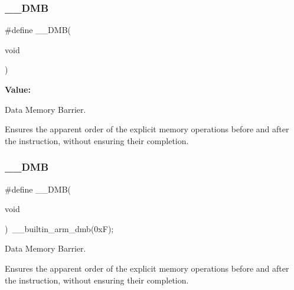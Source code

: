 \subsubsection{\texorpdfstring{\_\_DMB}{\_\_DMB}\hspace{0.1cm}{\footnotesize\ttfamily [1/2]}}
{\footnotesize\ttfamily \#define \+\_\+\+\_\+\+D\+MB(\begin{DoxyParamCaption}\item[{}]{void }\end{DoxyParamCaption})}

{\bfseries Value\+:}
\begin{DoxyCode}{0}
\DoxyCodeLine{\textcolor{keywordflow}{do} \{\(\backslash\)}

\end{DoxyCode}


Data Memory Barrier. 

Ensures the apparent order of the explicit memory operations before and after the instruction, without ensuring their completion. \mbox{\label{group___c_m_s_i_s___core___instruction_interface_ga671101179b5943990785f36f8c1e2269}} 
\subsubsection{\texorpdfstring{\_\_DMB}{\_\_DMB}\hspace{0.1cm}{\footnotesize\ttfamily [2/2]}}
{\footnotesize\ttfamily \#define \+\_\+\+\_\+\+D\+MB(\begin{DoxyParamCaption}\item[{}]{void }\end{DoxyParamCaption})~\+\_\+\+\_\+builtin\+\_\+arm\+\_\+dmb(0x\+F);}



Data Memory Barrier. 

Ensures the apparent order of the explicit memory operations before and after the instruction, without ensuring their completion. \mbox{\label{group___c_m_s_i_s___core___instruction_interface_ga067d257a2b34565410acefb5afef2203}} 
